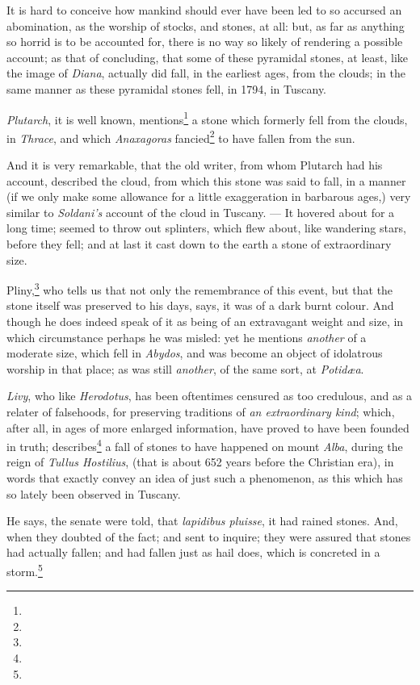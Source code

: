 \documentclass[a4paper, 12pt, oneside, twocolumn]{article}
\begin{document}
It is hard to conceive how mankind should ever have been led to so accursed an abomination, as the worship of stocks, and stones, at all: but, as far as anything so horrid is to be accounted for, there is no way so likely of rendering a possible account; as that of concluding, that some of these pyramidal stones, at least, like the image of \emph{Diana}, actually did fall, in the earliest ages, from the clouds; in the same manner as these pyramidal stones fell, in 1794, in Tuscany.

\emph{Plutarch}, it is well known, mentions\footnote{} a stone which formerly fell from the clouds, in \emph{Thrace}, and which \emph{Anaxagoras} fancied\footnote{} to have fallen from the sun.

And it is very remarkable, that the old writer, from whom Plutarch had his account, described the cloud, from which this stone was said to fall, in a manner (if we only make some allowance for a little exaggeration in barbarous ages,) very similar to \emph{Soldani's} account of the cloud in Tuscany. --- It hovered about for a long time; seemed to throw out splinters, which flew about, like wandering stars, before they fell; and at last it cast down to the earth a stone of extraordinary size.

Pliny,\footnote{} who tells us that not only the remembrance of this event, but that the stone itself was preserved to his days, says, it was of a dark burnt colour. And though he does indeed speak of it as being of an extravagant weight and size, in which circumstance perhaps he was misled: yet he mentions \emph{another} of a moderate size, which fell in \emph{Abydos}, and was become an object of idolatrous worship in that place; as was still \emph{another}, of the same sort, at \emph{Potidæa}.

\emph{Livy}, who like \emph{Herodotus}, has been oftentimes censured as too credulous, and as a relater of falsehoods, for preserving traditions of \emph{an extraordinary kind}; which, after all, in ages of more enlarged information, have proved to have been founded in truth; describes\footnote{} a fall of stones to have happened on mount \emph{Alba}, during the reign of \emph{Tullus Hostilius}, (that is about 652 years before the Christian era), in words that exactly convey an idea of just such a phenomenon, as this which has so lately been observed in Tuscany.

He says, the senate were told, that \emph{lapidibus pluisse}, it had rained stones. And, when they doubted of the fact; and sent to inquire; they were assured that stones had actually fallen; and had fallen just as hail does, which is concreted in a storm.\footnote{}
\end{document}
